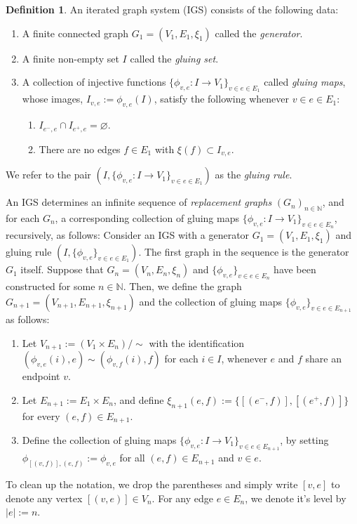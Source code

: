 \documentclass{amsart}
\numberwithin{equation}{section}
\theoremstyle{definition}
\newtheorem{definition}[equation]{Definition}
\theoremstyle{remark}
\newcommand{\N}{\mathbb{N}}
\begin{document}
\begin{definition}
    An iterated graph system (IGS) consists of the following data:
    \begin{enumerate}
        \item A finite connected graph \(G_1=(V_1,E_1,\xi_1)\) called the \emph{generator}.
        \item A finite non-empty set \(I\) called the \emph{gluing set}.
        \item A collection of injective functions \(\{\phi_{v,e}\colon I\to V_1\}_{v\in e\in E_1}\) called \emph{gluing maps}, whose images, \(I_{v,e}:=\phi_{v,e}(I)\), satisfy the following whenever \(v\in e\in E_1\):
        \begin{enumerate}
            \item \(I_{e^-,e}\cap I_{e^+,e}=\varnothing\).
            \item There are no edges \(f\in E_1\) with \(\xi(f)\subset I_{v,e}\). 
        \end{enumerate}
    \end{enumerate}
    We refer to the pair \((I,\{\phi_{v,e}\colon I\to V_1\}_{v\in e\in E_1})\) as the \emph{gluing rule}. 
\end{definition}



    An IGS determines an infinite sequence of \emph{replacement graphs} \((G_n)_{n\in \N}\), and for each \(G_n\), a corresponding collection of gluing maps \(\{\phi_{v,e}\colon I\to V_1\}_{v\in e\in E_n}\), recursively, as follows: Consider an IGS with a generator \(G_1=(V_1,E_1,\xi_1)\) and gluing rule \((I,\{\phi_{v,e}\}_{v\in e\in E_1})\). The first graph in the sequence is the generator \(G_1\) itself. Suppose that \(G_n=(V_n,E_n,\xi_n)\) and \(\{\phi_{v,e}\}_{v\in e\in E_n}\) have been constructed for some \(n\in\N\). Then, we define the graph \(G_{n+1}=(V_{n+1},E_{n+1},\xi_{n+1})\) and the collection of gluing maps \(\{\phi_{v,e}\}_{v\in e\in E_{n+1}}\) as follows:
        \begin{enumerate}
            \item Let \(V_{n+1}:=(V_1\times E_n)/\sim\) with the identification \((\phi_{v,e}(i),e)\sim(\phi_{v,f}(i),f)\) for each \(i\in I\), whenever \(e\) and \(f\) share an endpoint \(v\).
            \item Let \(E_{n+1}:= E_1\times E_n\), and define \(\xi_{n+1}(e,f):=\{[(e^-,f)],[(e^+,f)]\}\) for every \((e,f)\in E_{n+1}\).
            \item Define the collection of gluing maps \(\{\phi_{v,e}\colon I\to V_1\}_{v\in e\in E_{n+1}}\), by setting \(\phi_{[(v,f)],(e,f)}:=\phi_{v,e}\) for all \((e,f)\in E_{n+1}\) and \(v\in e\).
        \end{enumerate}
    To clean up the notation, we drop the parentheses and simply write \([v,e]\) to denote any vertex \([(v,e)]\in V_n\). For any edge \(e\in E_n\), we denote it's level by \(\lvert e\rvert:=n\).
\end{document}
